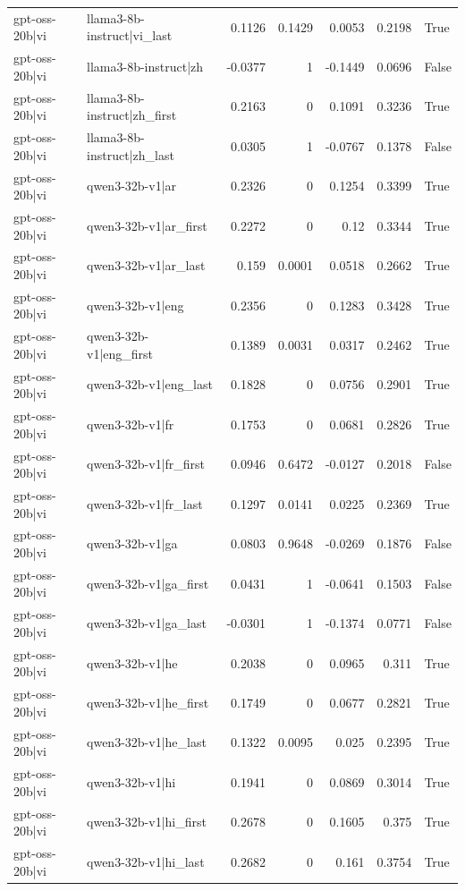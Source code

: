 \begin{table}
\begin{tabular}{l l r r r r l}
gpt-oss-20b|vi & llama3-8b-instruct|vi_last & 0.1126 & 0.1429 & 0.0053 & 0.2198 & True \\
gpt-oss-20b|vi & llama3-8b-instruct|zh & -0.0377 & 1 & -0.1449 & 0.0696 & False \\
gpt-oss-20b|vi & llama3-8b-instruct|zh_first & 0.2163 & 0 & 0.1091 & 0.3236 & True \\
gpt-oss-20b|vi & llama3-8b-instruct|zh_last & 0.0305 & 1 & -0.0767 & 0.1378 & False \\
gpt-oss-20b|vi & qwen3-32b-v1|ar & 0.2326 & 0 & 0.1254 & 0.3399 & True \\
gpt-oss-20b|vi & qwen3-32b-v1|ar_first & 0.2272 & 0 & 0.12 & 0.3344 & True \\
gpt-oss-20b|vi & qwen3-32b-v1|ar_last & 0.159 & 0.0001 & 0.0518 & 0.2662 & True \\
gpt-oss-20b|vi & qwen3-32b-v1|eng & 0.2356 & 0 & 0.1283 & 0.3428 & True \\
gpt-oss-20b|vi & qwen3-32b-v1|eng_first & 0.1389 & 0.0031 & 0.0317 & 0.2462 & True \\
gpt-oss-20b|vi & qwen3-32b-v1|eng_last & 0.1828 & 0 & 0.0756 & 0.2901 & True \\
gpt-oss-20b|vi & qwen3-32b-v1|fr & 0.1753 & 0 & 0.0681 & 0.2826 & True \\
gpt-oss-20b|vi & qwen3-32b-v1|fr_first & 0.0946 & 0.6472 & -0.0127 & 0.2018 & False \\
gpt-oss-20b|vi & qwen3-32b-v1|fr_last & 0.1297 & 0.0141 & 0.0225 & 0.2369 & True \\
gpt-oss-20b|vi & qwen3-32b-v1|ga & 0.0803 & 0.9648 & -0.0269 & 0.1876 & False \\
gpt-oss-20b|vi & qwen3-32b-v1|ga_first & 0.0431 & 1 & -0.0641 & 0.1503 & False \\
gpt-oss-20b|vi & qwen3-32b-v1|ga_last & -0.0301 & 1 & -0.1374 & 0.0771 & False \\
gpt-oss-20b|vi & qwen3-32b-v1|he & 0.2038 & 0 & 0.0965 & 0.311 & True \\
gpt-oss-20b|vi & qwen3-32b-v1|he_first & 0.1749 & 0 & 0.0677 & 0.2821 & True \\
gpt-oss-20b|vi & qwen3-32b-v1|he_last & 0.1322 & 0.0095 & 0.025 & 0.2395 & True \\
gpt-oss-20b|vi & qwen3-32b-v1|hi & 0.1941 & 0 & 0.0869 & 0.3014 & True \\
gpt-oss-20b|vi & qwen3-32b-v1|hi_first & 0.2678 & 0 & 0.1605 & 0.375 & True \\
gpt-oss-20b|vi & qwen3-32b-v1|hi_last & 0.2682 & 0 & 0.161 & 0.3754 & True \\

\end{tabular}
\end{table}
